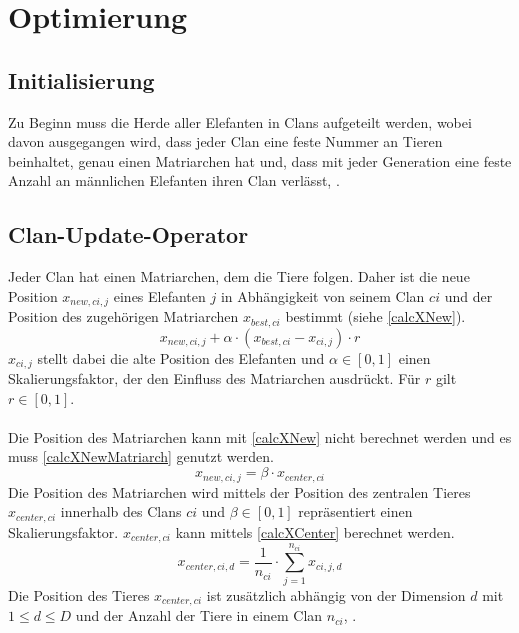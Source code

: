 {\let\clearpage\relax \chapter{Optimierung}}
\section{Initialisierung}
Zu Beginn muss die Herde aller Elefanten in Clans aufgeteilt werden, wobei davon ausgegangen wird, dass jeder Clan eine feste Nummer an Tieren beinhaltet, genau einen Matriarchen hat und, dass mit jeder Generation eine feste Anzahl an männlichen Elefanten ihren Clan verlässt, \cite[vgl. Wang et al, S.2]{wang_deb_coelho_2015}. 

\section{Clan-Update-Operator} \label{eho_clanUpdate}
Jeder Clan hat einen Matriarchen, dem die Tiere folgen. Daher ist die neue Position $x_{new, ci, j}$ eines Elefanten $j$ in Abhängigkeit von seinem Clan $ci$ und der Position des zugehörigen Matriarchen $x_{best, ci}$ bestimmt (siehe \autoref{calcXNew}). 
\begin{equation}
    x_{new, ci, j} + \alpha \cdot (x_{best, ci} - x_{ci, j}) \cdot r
    \label{calcXNew}
\end{equation}
$x_{ci, j}$ stellt dabei die alte Position des Elefanten und $\alpha \in [0,1]$ einen Skalierungsfaktor, der den Einfluss des Matriarchen ausdrückt. Für $r$ gilt $r \in [0,1]$.\\
\\
Die Position des Matriarchen kann mit \autoref{calcXNew} nicht berechnet werden und es muss \autoref{calcXNewMatriarch} genutzt werden.
\begin{equation}
    x_{new, ci, j} = \beta \cdot x_{center, ci}
    \label{calcXNewMatriarch}
\end{equation}
Die Position des Matriarchen wird mittels der Position des zentralen Tieres $x_{center, ci}$ innerhalb des Clans $ci$ und $\beta \in [0,1]$ repräsentiert einen Skalierungsfaktor. $x_{center, ci}$ kann mittels \autoref{calcXCenter} berechnet werden.
\begin{equation}
    x_{center, ci, d} = \frac{1}{n_{ci}} \cdot \sum_{j=1}^{n_{ci}} x_{ci,j,d}
    \label{calcXCenter}
\end{equation}
Die Position des Tieres $x_{center, ci}$ ist zusätzlich abhängig von der Dimension $d$ mit $1 \leq d \leq D$ und der Anzahl der Tiere in einem Clan $n_{ci}$, \cite[vgl. Wang et al, S.2]{wang_deb_coelho_2015}.

